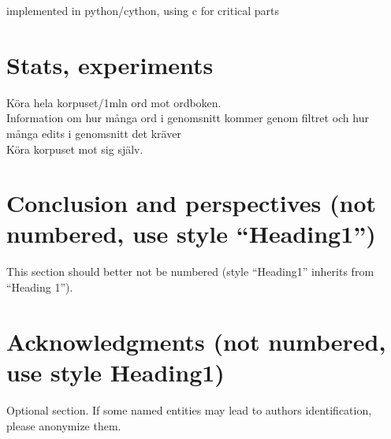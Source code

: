 \documentclass[10pt,a5paper,twoside]{article}
\begin{document}





implemented in python/cython, using c for critical parts

\section{Stats, experiments}
Köra hela korpuset/1mln ord mot ordboken. \\
Information om hur många ord i genomsnitt kommer genom filtret
och hur många edits i genomsnitt det kräver \\
Köra korpuset mot sig själv.

\section*{Conclusion and perspectives (not numbered, use style “Heading1”)} %
This section should better not be numbered (style “Heading1” inherits from “Heading 1”).

\section*{Acknowledgments (not numbered, use style Heading1)}
Optional section. If some named entities may lead to authors identification, please anonymize them.	\\

%





\nocite{TALN2007,LaigneletRioult09,LanglaisPatry07,au1972,cks1981,mb2012}

\end{document}
